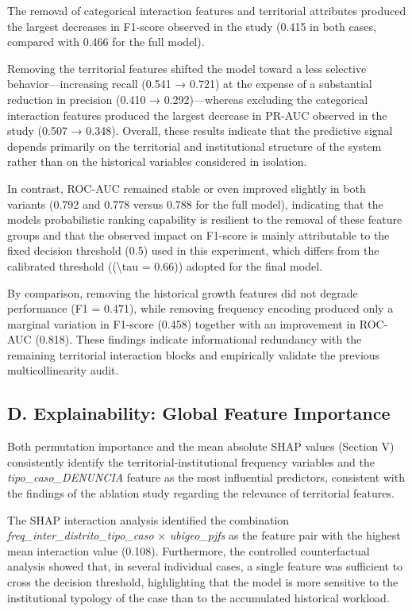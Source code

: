 \documentclass[
  number]{elsarticle}
\begin{document}
The removal of categorical interaction features and territorial
attributes produced the largest decreases in F1-score observed in the
study (0.415 in both cases, compared with 0.466 for the full model).

Removing the territorial features shifted the model toward a less
selective behavior---increasing recall (0.541 → 0.721) at the expense of
a substantial reduction in precision (0.410 → 0.292)---whereas excluding
the categorical interaction features produced the largest decrease in
PR-AUC observed in the study (0.507 → 0.348). Overall, these results
indicate that the predictive signal depends primarily on the territorial
and institutional structure of the system rather than on the historical
variables considered in isolation.

In contrast, ROC-AUC remained stable or even improved slightly in both
variants (0.792 and 0.778 versus 0.788 for the full model), indicating
that the model\textquotesingle s probabilistic ranking capability is
resilient to the removal of these feature groups and that the observed
impact on F1-score is mainly attributable to the fixed decision
threshold (0.5) used in this experiment, which differs from the
calibrated threshold ((\textbackslash tau = 0.66)) adopted for the final
model.

By comparison, removing the historical growth features did not degrade
performance (F1 = 0.471), while removing frequency encoding produced
only a marginal variation in F1-score (0.458) together with an
improvement in ROC-AUC (0.818). These findings indicate informational
redundancy with the remaining territorial interaction blocks and
empirically validate the previous multicollinearity audit.

\subsection{D. Explainability: Global Feature
Importance}\label{d.-explainability-global-feature-importance}

Both permutation importance and the mean absolute SHAP values (Section
V) consistently identify the territorial-institutional frequency
variables and the \emph{tipo\_caso\_DENUNCIA} feature as the most
influential predictors, consistent with the findings of the ablation
study regarding the relevance of territorial features.

The SHAP interaction analysis identified the combination
\emph{freq\_inter\_distrito\_tipo\_caso} × \emph{ubigeo\_pjfs} as the
feature pair with the highest mean interaction value (0.108).
Furthermore, the controlled counterfactual analysis showed that, in
several individual cases, a single feature was sufficient to cross the
decision threshold, highlighting that the model is more sensitive to the
institutional typology of the case than to the accumulated historical
workload.
\end{document}
